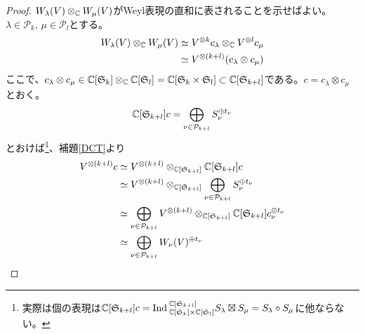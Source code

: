 \documentclass{ltjsreport}
\begin{document}
\begin{proof}
  $W_\lambda(V)\otimes_{\mathbb{C}}W_\mu(V)$がWeyl表現の直和に表されることを示せばよい。$\lambda\in\mathcal{P}_k$, $\mu\in\mathcal{P}_l$とする。
  \begin{align*}
    W_\lambda(V)\otimes_{\mathbb{C}} W_\mu(V)
    &\simeq V^{\otimes k}c_\lambda\otimes_{\mathbb{C}}V^{\otimes l}c_\mu\\
    &\simeq V^{\otimes (k+l)}(c_\lambda\otimes c_\mu)
  \end{align*}
  ここで、$c_\lambda\otimes c_\mu\in\mathbb{C}[\mathfrak{S}_k]\otimes_{\mathbb{C}}\mathbb{C}[\mathfrak{S}_l]=\mathbb{C}[\mathfrak{S}_{k}\times\mathfrak{S}_l]\subset\mathbb{C}[\mathfrak{S}_{k+l}]$である。$c=c_\lambda\otimes c_\mu$とおく。
  \[
  \mathbb{C}[\mathfrak{S}_{k+l}]c=\bigoplus_{\nu\in\mathcal{P}_{k+l}}S_\nu^{\oplus t_\nu}
  \]
  とおけば\footnote{
    実際は個の表現は$\mathbb{C}[\mathfrak{S}_{k+l}]c=\text{Ind}\:_{\mathbb{C}[\mathfrak{S}_k]\times\mathbb{C}[\mathfrak{S}_l]}^{\mathbb{C}[\mathfrak{S}_{k+l}]}S_\lambda\boxtimes S_\mu=S_\lambda\circ S_\mu$に他ならない。
  }、補題\ref{DCT}より
  \begin{align*}
    V^{\otimes (k+l)}c
    &\simeq V^{\otimes (k+l)}\otimes_{\mathbb{C}[\mathfrak{S}_{k+l}]}\mathbb{C}[\mathfrak{S}_{k+l}]c\\
    &\simeq V^{\otimes (k+l)}\otimes_{\mathbb{C}[\mathfrak{S}_{k+l}]}\bigoplus_{\nu\in\mathcal{P}_{k+l}}S_\nu^{\oplus t_\nu}\\
    &\simeq \bigoplus_{\nu\in\mathcal{P}_{k+l}}V^{\otimes (k+l)}\otimes_{\mathbb{C}[\mathfrak{S}_{k+l}]}\mathbb{C}[\mathfrak{S}_{k+l}]c_\nu^{\oplus t_\nu}\\
    &\simeq \bigoplus_{\nu\in\mathcal{P}_{k+l}}W_\nu(V)^{\oplus t_\nu}\\
  \end{align*}
\end{proof}
\end{document}
